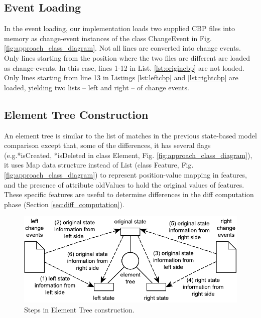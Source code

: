 \documentclass{jot}
\begin{document}
\vspace{-20pt}
\subsection{Event Loading}
\label{sec:event_loading}
In the event loading, our implementation loads two supplied CBP files into memory as change-event instances of the class \textsf{ChangeEvent} in Fig. \ref{fig:approach_class_diagram}. Not all lines are converted into change events. Only lines starting from the position where the two files are different are loaded as change-events. In this case, lines 1-12 in List. \ref{lst:origincbp} are not loaded. Only lines starting from line 13 in Listings \ref{lst:leftcbp} and \ref{lst:rightcbp} are loaded, yielding two lists -- left and right -- of change events. 

\subsection{Element Tree Construction}
\label{sec:tree_construction}
An element tree is similar to the list of matches in the previous state-based model comparison except that, some of the differences, it has several flags (e.g.\textsf{*isCreated}, \textsf{*isDeleted} in class \textsf{Element}, Fig. \ref{fig:approach_class_diagram}), it uses Map data structure instead of List (class \textsf{Feature}, Fig. \ref{fig:approach_class_diagram}) to represent position-value mapping in features, and the presence of attribute \textsf{oldValues} to hold the original values of features. These specific features are useful to determine differences in the diff computation phase (Section \ref{sec:diff_computation}).

\vspace{-30pt}
\begin{figure}
    \includegraphics[width=\linewidth]{TreeConstruction}
    \caption{Steps in Element Tree construction.}
    \label{fig:tree_construction}
\end{figure}
\end{document}
